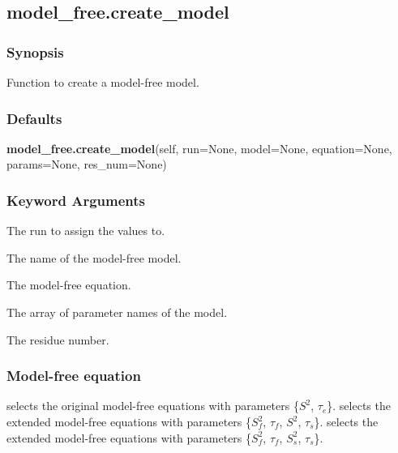 

  

 \newpage 

 \subsection{model\_free.create\_model} 

  
 \subsubsection{Synopsis} 

 Function to create a model-free model. 
  

  
 \subsubsection{Defaults} 

 \textsf{\textbf{model\_free.create\_model}(self, run=None, model=None, equation=None, params=None, res\_num=None)} 

  
 \subsubsection{Keyword Arguments} 

   The run to assign the values to.   

   The name of the model-free model.   

   The model-free equation.   

   The array of parameter names of the model.   

   The residue number.  

  

  
 \subsubsection{Model-free equation} 

  selects the original model-free equations with parameters \{$S^2$, $\tau_e$\}.  selects the extended model-free equations with parameters \{$S^2_f$, $\tau_f$, $S^2$, $\tau_s$\}.  selects the extended model-free equations with parameters \{$S^2_f$, $\tau_f$, $S^2_s$, $\tau_s$\}. 
  

